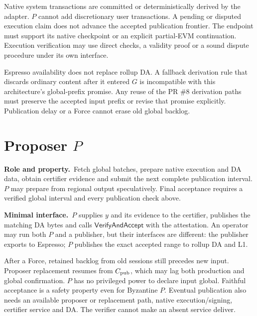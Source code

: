 \documentclass[11pt,a4paper]{article}
\newcommand{\api}[1]{\ensuremath{\mathsf{#1}}}
\newcommand{\role}{\textbf{Role and property.}\ }
\newcommand{\iface}{\textbf{Minimal interface.}\ }
\begin{document}
Native system transactions are committed or deterministically derived
by the adapter. $P$ cannot add discretionary user transactions. A pending
or disputed execution claim does not advance the accepted publication
frontier. The endpoint must support its native checkpoint or an explicit
partial-EVM continuation. Execution verification may use direct checks,
a validity proof or a sound dispute procedure under its own interface.

Espresso availability does not replace rollup DA. A fallback derivation
rule that discards ordinary content after it entered $G$ is incompatible
with this architecture's global-prefix promise. Any reuse of the PR
\#8 derivation paths must preserve the accepted input prefix or revise
that promise explicitly. Publication delay or a Force cannot erase
old global backlog.

\section{Proposer \texorpdfstring{$P$}{P}}\label{sec:proposer}
\role Fetch global batches, prepare native execution and DA data, obtain
certifier evidence and submit the next complete publication interval.
$P$ may prepare from regional output speculatively. Final acceptance
requires a verified global interval and every publication check above.

\iface $P$ supplies $y$ and its evidence to the certifier, publishes the
matching DA bytes and calls \api{VerifyAndAccept} with the attestation.
An operator may run both $P$ and a publisher, but their interfaces are
different: the publisher exports to Espresso; $P$ publishes the exact
accepted range to rollup DA and L1.

After a Force, retained backlog from old sessions still precedes new
input. Proposer replacement resumes from $C_{\rm pub}$, which may lag
both production and global confirmation. $P$ has no privileged power
to declare input global. Faithful acceptance is a safety property even
for Byzantine $P$. Eventual publication also needs an available proposer
or replacement path, native execution/signing, certifier service and DA.
The verifier cannot make an absent service deliver.

\clearpage
\end{document}
